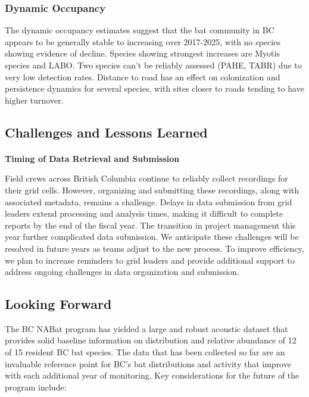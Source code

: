 \documentclass[
  letterpaper,
  DIV=11,
  numbers=noendperiod]{scrartcl}
\makeatletter
\let\oldparagraph\paragraph
\renewcommand{\paragraph}{
    \@ifstar
      \xxxParagraphStar
      \xxxParagraphNoStar
  }
\newcommand{\xxxParagraphStar}[1]{\oldparagraph*{#1}\mbox{}}
\newcommand{\xxxParagraphNoStar}[1]{\oldparagraph{#1}\mbox{}}
\makeatother
\begin{document}
\subsubsection{Dynamic Occupancy}\label{dynamic-occupancy-1}

The dynamic occupancy estimates suggest that the bat community in BC
appears to be generally stable to increasing over 2017-2025, with no
species showing evidence of decline. Species showing strongest increases
are Myotis species and LABO. Two species can't be reliably assessed
(PAHE, TABR) due to very low detection rates. Distance to road has an
effect on colonization and persistence dynamics for several species,
with sites closer to roads tending to have higher turnover.

\subsection{Challenges and Lessons
Learned}\label{challenges-and-lessons-learned}

\paragraph{\texorpdfstring{\textbf{Timing of Data Retrieval and
Submission}}{Timing of Data Retrieval and Submission}}\label{timing-of-data-retrieval-and-submission}

Field crews across British Columbia continue to reliably collect
recordings for their grid cells. However, organizing and submitting
these recordings, along with associated metadata, remains a challenge.
Delays in data submission from grid leaders extend processing and
analysis times, making it difficult to complete reports by the end of
the fiscal year. The transition in project management this year further
complicated data submission. We anticipate these challenges will be
resolved in future years as teams adjust to the new process. To improve
efficiency, we plan to increase reminders to grid leaders and provide
additional support to address ongoing challenges in data organization
and submission.

\subsection{Looking Forward}\label{looking-forward}

The BC NABat program has yielded a large and robust acoustic dataset
that provides solid baseline information on distribution and relative
abundance of 12 of 15 resident BC bat species. The data that has been
collected so far are an invaluable reference point for BC's bat
distributions and activity that improve with each additional year of
monitoring. Key considerations for the future of the program include:
\end{document}
